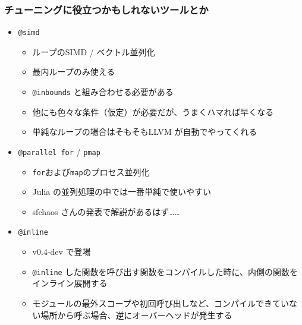  \begin{frame}[containsverbatim]
 \frametitle{チューニングに役立つかもしれないツールとか}
 \begin{itemize}
   \item \verb|@simd|
     \begin{itemize}
       \item ループのSIMD / ベクトル並列化
       \item 最内ループのみ使える
       \item \verb|@inbounds| と組み合わせる必要がある
       \item 他にも色々な条件（仮定）が必要だが、うまくハマれば早くなる
       \item 単純なループの場合はそもそもLLVM が自動でやってくれる
     \end{itemize}
   \item \verb|@parallel for| / \verb|pmap|
     \begin{itemize}
       \item \verb|for|および\verb|map|のプロセス並列化
       \item Julia の並列処理の中では一番単純で使いやすい
       \item sfchaos さんの発表で解説があるはず……
     \end{itemize}
   \item \verb|@inline|
     \begin{itemize}
       \item v0.4-dev で登場
       \item \verb|@inline| した関数を呼び出す関数をコンパイルした時に、内側の関数をインライン展開する
       \item モジュールの最外スコープや初回呼び出しなど、コンパイルできていない場所から呼ぶ場合、逆にオーバーヘッドが発生する
     \end{itemize}
 \end{itemize}
 \end{frame}

